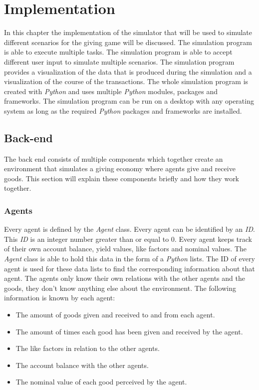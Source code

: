 \documentclass[twoside,openright]{uva-bachelor-thesis}
\begin{document}
\chapter{Implementation}
In this chapter the implementation of the simulator that will be used to simulate different scenarios for the giving game will be discussed. The simulation program is able to execute multiple tasks. The simulation program is able to accept different user input to simulate multiple scenarios. The simulation program provides a visualization of the data that is produced during the simulation and a visualization of the course of the transactions. The whole simulation program is created with \textit{Python} and uses multiple \textit{Python} modules, packages and frameworks. The simulation program can be run on a desktop with any operating system as long as the required \textit{Python} packages and frameworks are installed. 

\section{Back-end}
The back end consists of multiple components which together create an environment that simulates a giving economy where agents give and receive goods. This section will explain these components briefly and how they work together. 

\subsection{Agents}
Every agent is defined by the \textit{Agent} class. Every agent can be identified by an \textit{ID}. This \textit{ID} is an integer number greater than or equal to 0. Every agent keeps track of their own account balance, yield values, like factors and nominal values. The \textit{Agent} class is able to hold this data in the form of a \textit{Python} lists. The ID of every agent is used for these data lists to find the corresponding information about that agent. The agents only know their own relations with the other agents and the goods, they don't know anything else about the environment. The following information is known by each agent:
\begin{itemize}
\item The amount of goods given and received to and from each agent.
\item The amount of times each good has been given and received by the agent.
\item The like factors in relation to the other agents.
\item The account balance with the other agents.
\item The nominal value of each good perceived by the agent.
\end{itemize}
\end{document}
